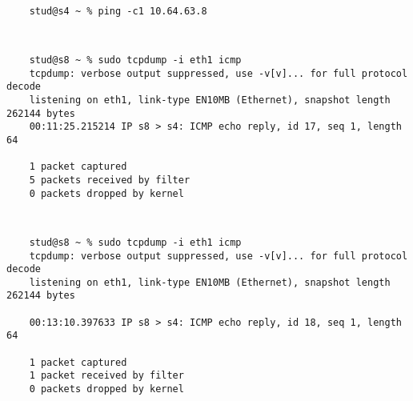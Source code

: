 \documentclass[a4paper,11pt]{article}
\begin{document}
{\tt
\begin{verbatim}
    stud@s4 ~ % ping -c1 10.64.63.8
\end{verbatim}
}

{\tt
\begin{verbatim}
    stud@s8 ~ % sudo tcpdump -i eth1 icmp
    tcpdump: verbose output suppressed, use -v[v]... for full protocol decode
    listening on eth1, link-type EN10MB (Ethernet), snapshot length 262144 bytes
    00:11:25.215214 IP s8 > s4: ICMP echo reply, id 17, seq 1, length 64

    1 packet captured
    5 packets received by filter
    0 packets dropped by kernel 
\end{verbatim}
}

{\tt
\begin{verbatim}
    stud@s8 ~ % sudo tcpdump -i eth1 icmp
    tcpdump: verbose output suppressed, use -v[v]... for full protocol decode
    listening on eth1, link-type EN10MB (Ethernet), snapshot length 262144 bytes

    00:13:10.397633 IP s8 > s4: ICMP echo reply, id 18, seq 1, length 64

    1 packet captured
    1 packet received by filter
    0 packets dropped by kernel 
\end{verbatim}
}
\end{document}
